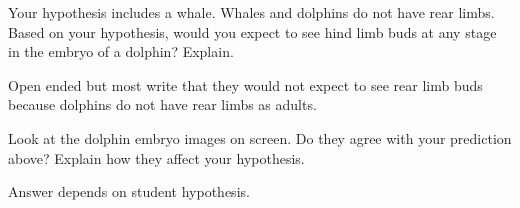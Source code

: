 \documentclass[12pt, hidelinks]{exam}
\newcommand*\AnswerBox[2]{%
    \parbox[t][#1]{0.92\textwidth}{%
    \begin{solution}#2\end{solution}}
}
\begin{document}
\begin{questions}
\question[3]
Your hypothesis includes a whale.  Whales and dolphins do not have 
rear limbs. Based on your hypothesis, would you expect to 
see hind limb buds at any stage in the embryo of a dolphin? Explain.

\AnswerBox{5\baselineskip}{Open ended but most write that they would not expect to see rear limb buds because dolphins do not have rear limbs as adults.}

\question[2]
Look at the dolphin embryo images on screen. Do they agree
with your prediction above? Explain how they affect your hypothesis.

\AnswerBox{3\baselineskip}{Answer depends on student hypothesis.}

\end{questions}
\end{document}
